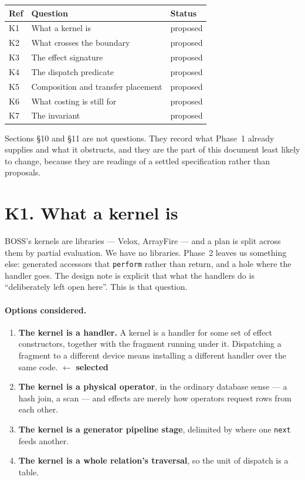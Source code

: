 \documentclass[11pt,a4paper]{article}
\newcommand{\selected}{\textcolor{decided}{$\leftarrow$ \textbf{selected}}}
\newcommand{\options}{\paragraph{Options considered.}}
\newcommand{\proposed}{\textcolor{open}{\textsf{proposed}}}
\begin{document}
\begin{center}
\begin{tabular}{@{}llp{4.6cm}@{}}
\hline
\textbf{Ref} & \textbf{Question} & \textbf{Status} \\
\hline
K1 & What a kernel is                     & \proposed \\
K2 & What crosses the boundary            & \proposed \\
K3 & The effect signature                 & \proposed \\
K4 & The dispatch predicate               & \proposed \\
K5 & Composition and transfer placement   & \proposed \\
K6 & What costing is still for            & \proposed \\
K7 & The invariant                        & \proposed \\
\hline
\end{tabular}
\end{center}

\noindent
Sections \S10 and \S11 are not questions. They record what Phase~1 already
supplies and what it obstructs, and they are the part of this document least
likely to change, because they are readings of a settled specification rather
than proposals.

\section{K1. What a kernel is}

BOSS's kernels are libraries --- Velox, ArrayFire --- and a plan is split
across them by partial evaluation. We have no libraries. Phase~2 leaves us
something else: generated accessors that \texttt{perform} rather than return,
and a hole where the handler goes. The design note is explicit that what the
handlers do is ``deliberately left open here''. This is that question.

\options
\begin{enumerate}[label=\textbf{(\alph*)}]
  \item \textbf{The kernel is a handler.} A kernel is a handler for some set
        of effect constructors, together with the fragment running under it.
        Dispatching a fragment to a different device means installing a
        different handler over the same code. \selected
  \item \textbf{The kernel is a physical operator}, in the ordinary database
        sense --- a hash join, a scan --- and effects are merely how operators
        request rows from each other.
  \item \textbf{The kernel is a generator pipeline stage}, delimited by where
        one \texttt{next} feeds another.
  \item \textbf{The kernel is a whole relation's traversal}, so the unit of
        dispatch is a table.
\end{enumerate}
\end{document}
